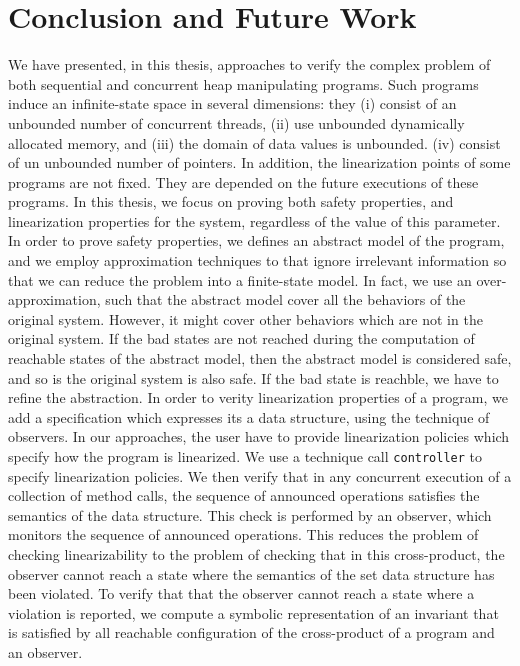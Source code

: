 \chapter{Conclusion and Future Work}
\label{chapter:conclusion}
\label{chapter:future:work}
We have presented, in this thesis, approaches to verify the complex problem of
both sequential and concurrent heap manipulating programs.%
Such programs induce an infinite-state space in several dimensions:
they %
(i) consist of an unbounded number of concurrent threads, %
(ii) use unbounded dynamically allocated memory, and %
(iii) the domain of data values is unbounded. %
(iv) consist of un unbounded number of pointers. In addition, the linearization points of some programs are not fixed. They are depended on the future executions of these programs. In this thesis, we focus on proving both safety properties, and linearization properties for the system, regardless of the value of this parameter. In order to prove safety properties, we defines an abstract model of the program, and we employ approximation techniques to that ignore irrelevant information so that we can reduce the problem
into a finite-state model. In fact, we use an over-approximation, such that the abstract model
cover all the behaviors of the original system. However, it might cover other behaviors which are not in the original system. If the bad states are not reached during the computation of reachable states of the abstract model, then the abstract model is considered safe, and so is the original system is also safe. If the bad state is reachble, we have to refine the abstraction. In order to verity linearization properties of a program, we add a specification which expresses its a data structure, using the technique of observers. In our approaches, the user have to provide linearization policies which specify how the program is linearized. We use a technique call {\tt controller} to specify linearization policies. We then verify that in any concurrent execution of a collection of method calls, the sequence of announced operations satisfies the semantics of the data structure. This check is performed by an observer, which monitors the sequence of announced operations. This reduces the problem of checking linearizability to the problem of checking that in this cross-product, the observer cannot reach a state where the semantics of the set data structure has been violated. To verify that that the observer cannot reach a state where a violation is reported, we compute a symbolic representation of an invariant that is satisfied by all reachable configuration of the cross-product of a program and an observer.%


